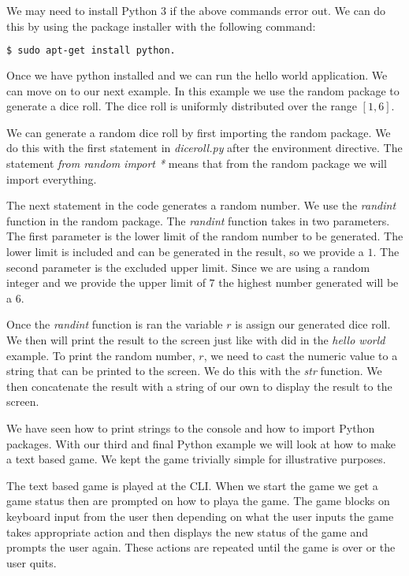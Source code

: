 We may need to install Python 3 if the above commands error out. We can do this by using the package installer with the following command:

\begin{lstlisting}[language=bash]
    $ sudo apt-get install python.
\end{lstlisting}

Once we have python installed and we can run the hello world application. We can move on to our next example. In this example we use the random package to generate a dice roll. The dice roll is uniformly distributed over the range $[1,6]$. 

We can generate a random dice roll by first importing the random package. We do this with the first statement in \emph{diceroll.py} after the environment directive. The statement \emph{from random import *} means that from the random package we will import everything. 

The next statement in the code generates a random number. We use the \emph{randint} function in the random package. The \emph{randint} function takes in two parameters. The first parameter is the lower limit of the random number to be generated. The lower limit is included and can be generated in the result, so we provide a $1$. The second parameter is the excluded upper limit. Since we are using a random integer and we provide the upper limit of $7$ the highest number generated will be a $6$. 

Once the \emph{randint} function is ran the variable $r$ is assign our generated dice roll. We then will print the result to the screen just like with did in the \emph{hello world} example. To print the random number, $r$, we need to cast the numeric value to a string that can be printed to the screen. We do this with the \emph{str} function. We then concatenate the result with a string of our own to display the result to the screen.
	


We have seen how to print strings to the console and how to import Python packages. With our third and final Python example we will look at how to make a text based game. We kept the game trivially simple for illustrative purposes. 

The text based game is played at the \ac{CLI}. When we start the game we get a game status then are prompted on how to playa the game. The game blocks on keyboard input from the user then depending on what the user inputs the game takes appropriate action and then displays the new status of the game and prompts the user again. These actions are repeated until the game is over or the user quits. 

